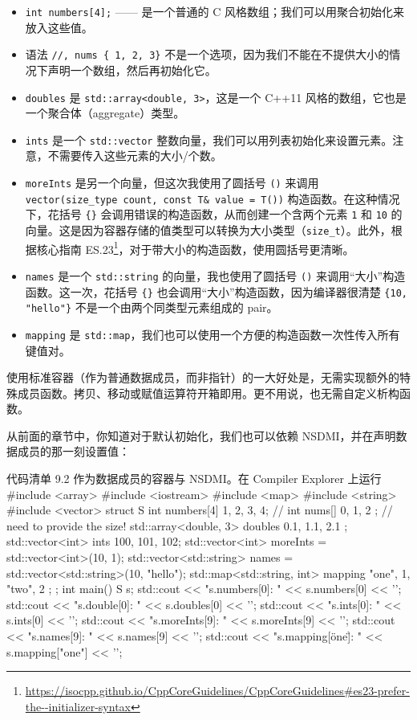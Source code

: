 \begin{itemize}
\item \texttt{int numbers[4];} —— 是一个普通的 C 风格数组；我们可以用聚合初始化来放入这些值。
\item 语法 \texttt{//, nums \{ 1, 2, 3\}} 不是一个选项，因为我们不能在不提供大小的情况下声明一个数组，然后再初始化它。
\item \texttt{doubles} 是 \texttt{std::array<double, 3>}，这是一个 C++11 风格的数组，它也是一个聚合体（aggregate）类型。
\item \texttt{ints} 是一个 \texttt{std::vector} 整数向量，我们可以用列表初始化来设置元素。注意，不需要传入这些元素的大小/个数。
\item \texttt{moreInts} 是另一个向量，但这次我使用了圆括号 \texttt{()} 来调用 \texttt{vector(size\_type count, const T\& value = T())} 构造函数。在这种情况下，花括号 \texttt{\{\}} 会调用错误的构造函数，从而创建一个含两个元素 \texttt{1} 和 \texttt{10} 的向量。这是因为容器存储的值类型可以转换为大小类型（\texttt{size\_t}）。此外，根据核心指南 ES.23\footnote{\url{https://isocpp.github.io/CppCoreGuidelines/CppCoreGuidelines\#es23-prefer-the--initializer-syntax}}，对于带大小的构造函数，使用圆括号更清晰。
\item \texttt{names} 是一个 \texttt{std::string} 的向量，我也使用了圆括号 \texttt{()} 来调用“大小”构造函数。这一次，花括号 \texttt{\{\}} 也会调用“大小”构造函数，因为编译器很清楚 \texttt{\{10, "hello"\}} 不是一个由两个同类型元素组成的 pair。
\item \texttt{mapping} 是 \texttt{std::map}，我们也可以使用一个方便的构造函数一次性传入所有键值对。
\end{itemize}

使用标准容器（作为普通数据成员，而非指针）的一大好处是，无需实现额外的特殊成员函数。拷贝、移动或赋值运算符开箱即用。更不用说，也无需自定义析构函数。

从前面的章节中，你知道对于默认初始化，我们也可以依赖 NSDMI，并在声明数据成员的那一刻设置值：

\begin{codeboxt}[cpp]{代码清单 9.2 作为数据成员的容器与 NSDMI。在 Compiler Explorer 上运行}
#include <array>
#include <iostream>
#include <map>
#include <string>
#include <vector>
struct S {
    int numbers[4] { 1, 2, 3, 4};
    // int nums[] { 0, 1, 2 }; // need to provide the size!
    std::array<double, 3> doubles { 0.1, 1.1, 2.1 };
    std::vector<int> ints { 100, 101, 102};
    std::vector<int> moreInts = std::vector<int>(10, 1);
    std::vector<std::string> names = std::vector<std::string>(10, "hello");
    std::map<std::string, int> mapping { {"one", 1}, {"two", 2} };
};
int main() {
    S s;
    std::cout << "s.numbers[0]: " << s.numbers[0] << '\n';
    std::cout << "s.double[0]: " << s.doubles[0] << '\n';
    std::cout << "s.ints[0]: " << s.ints[0] << '\n';
    std::cout << "s.moreInts[9]: " << s.moreInts[9] << '\n';
    std::cout << "s.names[9]: " << s.names[9] << '\n';
    std::cout << "s.mapping[\"one\"]: " << s.mapping["one"] << '\n';
}
\end{codeboxt}


